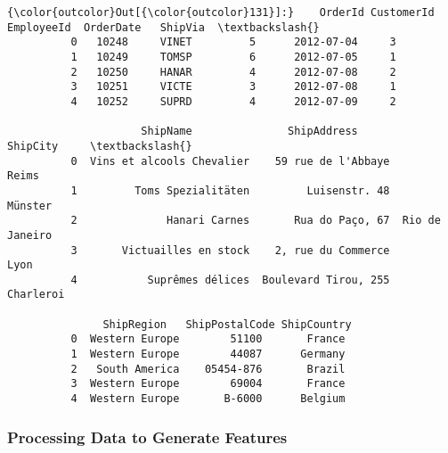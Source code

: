 \documentclass[11pt]{article}
\begin{document}
\begin{Verbatim}[commandchars=\\\{\}]
{\color{outcolor}Out[{\color{outcolor}131}]:}    OrderId CustomerId  EmployeeId  OrderDate   ShipVia  \textbackslash{}
          0   10248     VINET         5      2012-07-04     3      
          1   10249     TOMSP         6      2012-07-05     1      
          2   10250     HANAR         4      2012-07-08     2      
          3   10251     VICTE         3      2012-07-08     1      
          4   10252     SUPRD         4      2012-07-09     2      
          
                     ShipName               ShipAddress          ShipCity     \textbackslash{}
          0  Vins et alcools Chevalier    59 rue de l'Abbaye           Reims   
          1         Toms Spezialitäten         Luisenstr. 48         Münster   
          2              Hanari Carnes       Rua do Paço, 67  Rio de Janeiro   
          3       Victuailles en stock    2, rue du Commerce            Lyon   
          4           Suprêmes délices  Boulevard Tirou, 255       Charleroi   
          
               ShipRegion   ShipPostalCode ShipCountry  
          0  Western Europe        51100       France   
          1  Western Europe        44087      Germany   
          2   South America    05454-876       Brazil   
          3  Western Europe        69004       France   
          4  Western Europe       B-6000      Belgium   
\end{Verbatim}
            
    \hypertarget{processing-data-to-generate-features}{%
\subsubsection{Processing Data to Generate
Features}\label{processing-data-to-generate-features}}
\end{document}
